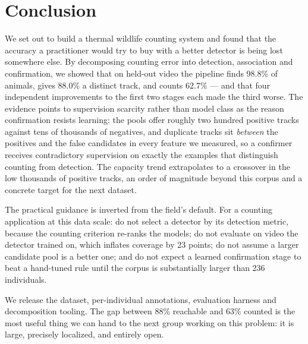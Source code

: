 \section{Conclusion}
\label{sec:conclusion}

We set out to build a thermal wildlife counting system and found that the accuracy a
practitioner would try to buy with a better detector is being lost somewhere else. By
decomposing counting error into detection, association and confirmation, we showed that on
held-out video the pipeline finds 98.8\% of animals, gives 88.0\% a distinct track, and
counts 62.7\% --- and that four independent improvements to the first two stages each made
the third worse. The evidence points to supervision scarcity rather than model class as the
reason confirmation resists learning: the pools offer roughly two hundred positive tracks
against tens of thousands of negatives, and duplicate tracks sit \emph{between} the positives
and the false candidates in every feature we measured, so a confirmer receives contradictory
supervision on exactly the examples that distinguish counting from detection. The capacity
trend extrapolates to a crossover in the low thousands of positive tracks, an order of
magnitude beyond this corpus and a concrete target for the next dataset.

The practical guidance is inverted from the field's default. For a counting application at
this data scale: do not select a detector by its detection metric, because the counting
criterion re-ranks the models; do not evaluate on video the detector trained on, which
inflates coverage by 23 points; do not assume a larger candidate pool is a better one; and
do not expect a learned confirmation stage to beat a hand-tuned rule until the corpus is
substantially larger than 236 individuals.

We release the dataset, per-individual annotations, evaluation harness and decomposition
tooling. The gap between 88\% reachable and 63\% counted is the most useful thing we can
hand to the next group working on this problem: it is large, precisely localized, and
entirely open.
